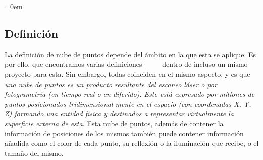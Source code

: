 \parindent=0em
\subsection{Definición}
\noindent

La definición de nube de puntos depende del ámbito en la que esta se aplique. Es por ello, que encontramos varias definiciones ~\cite{DefinicionesNubePuntos1} ~\cite{DefinicionesNubePuntos2} ~\cite{DefinicionesNubePuntos3} dentro de incluso un mismo proyecto para esta. Sin embargo, todas coinciden en el mismo aspecto, y es que \textit{ una nube de puntos es un producto resultante del escaneo láser o por fotogrametría (en tiempo real o en diferido). Este está expresado por millones de puntos posicionados tridimensional mente en el espacio (con coordenadas X, Y, Z) formando una entidad física y destinados a representar virtualmente la superficie externa de esta}. Esta nube de puntos, además de contener la información de posiciones de los mismos también puede contener información añadida como el color de cada punto, su reflexión o la iluminación que recibe, o el tamaño del mismo.\\